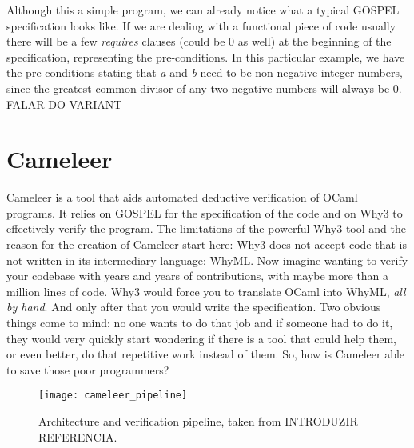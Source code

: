 {Although this a simple program, we can already notice what a typical GOSPEL specification looks like.
If we are dealing with a functional piece of code usually there will be a few \emph{requires} clauses (could be 0 as well) at the beginning of the specification, representing the pre-conditions.
In this particular example, we have the pre-conditions stating that \emph{a} and \emph{b} need to be non negative integer numbers, since the greatest common divisor of any two negative numbers will always be 0.
FALAR DO VARIANT


\section{Cameleer}
\label{sec:cameleer}

Cameleer is a tool that aids automated deductive verification of OCaml programs.
It relies on GOSPEL for the specification of the code and on Why3 to effectively verify the program.
The limitations of the powerful Why3 tool and the reason for the creation of Cameleer start here: Why3 does not accept code that is not written in its intermediary language: WhyML.
Now imagine wanting to verify your codebase with years and years of contributions, with maybe more than a million lines of code.
Why3 would force you to translate OCaml into WhyML, \emph{all by hand}. 
And only after that you would write the specification.
Two obvious things come to mind: no one wants to do that job and if someone had to do it, they would very quickly start wondering if there is a tool that could help them, or even better, do that repetitive work instead of them.
So, how is Cameleer able to save those poor programmers?

\begin{figure}[htbp]
  \centering
  \texttt{[image: cameleer\_pipeline]}
  \caption{Architecture and verification pipeline, taken from INTRODUZIR REFERENCIA.}
  \label{fig:cameleer_pipeline}
\end{figure}

}
